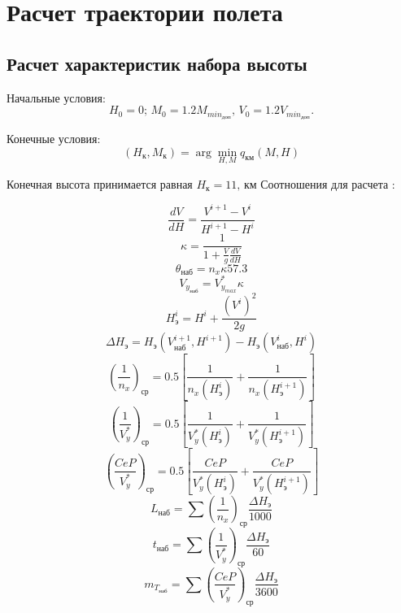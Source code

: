 \chapter{Расчет траектории полета}

\section{Расчет характеристик набора высоты}
Начальные условия:
\[
    H_0 = 0;\, M_0 = 1.2 M_{{min}_{доп}},\,V_0 = 1.2 V_{{min}_{доп}}.
\]

Конечные условия: 
\[
    (H_к, M_к) = \arg \min_{H, M} q_{км} (M, H)
\]

Конечная высота принимается равная $H_к = 11, \, \text{км}$
Соотношения для расчета :

\begin{equation}
    \frac{dV}{dH} = \frac{V^{i + 1} - V^i}{H^{i + 1} - H^i}
\end{equation}
\begin{equation}
    \kappa = \frac{1}{1 + \frac{V}{g} \frac{d {V}}{d {H}}}
\end{equation}
\begin{equation}
    \theta_{наб} = n_x \kappa 57.3
\end{equation}
\begin{equation}
    V_{y_{наб}} = V_{y_{max}}^* \kappa
\end{equation}
\begin{equation}
    H_э^i = H^i + \frac{(V^i)^2}{2g}
\end{equation}
\begin{equation}
    \Delta H_э = H_э (V_{наб}^{i+1}, H^{i+1}) - H_э (V_{наб}^{i}, H^{i})
\end{equation}
\begin{equation}
    \left( \frac{1}{n_x} \right)_{ср}  = 0.5 \left[ \frac{1}{n_x(H_э^i)} + \frac{1}{n_x(H_э^{i+1})} \right] 
\end{equation}
\begin{equation}
    \left( \frac{1}{V_y^*} \right)_{ср}  = 0.5 \left[ \frac{1}{V_y^*(H_э^i)} + \frac{1}{V_y^*(H_э^{i+1})} \right] 
\end{equation}
\begin{equation}
    \left( \frac{CeP}{V_y^*} \right)_{ср}  = 0.5 \left[ \frac{CeP}{V_y^*(H_э^i)} + \frac{CeP}{V_y^*(H_э^{i+1})} \right] 
\end{equation}
\begin{equation}
    L_{наб} = \sum \left( \frac{1}{n_x} \right)_{ср} \frac{\Delta H_{э}}{1000}
\end{equation}
\begin{equation}
    t_{наб} = \sum \left( \frac{1}{V_y^*} \right)_{ср} \frac{\Delta H_{э}}{60}
\end{equation}
\begin{equation}
    m_{T_{наб}} = \sum \left( \frac{CeP}{V_y^*} \right)_{ср} \frac{\Delta H_{э}}{3600}
\end{equation}

